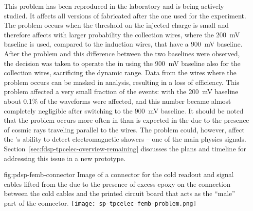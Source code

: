 This problem has been reproduced in the laboratory and is being actively 
studied. It affects all versions of  fabricated after 
the one used for the  experiment. The problem occurs 
when the threshold on the injected charge is small and therefore affects
with larger probability the collection wires, where the \SI{200}{mV} baseline 
is used, compared to the induction wires, that have a \SI{900}{mV} baseline.
After the problem and this difference between the two baselines were 
observed, the decision was taken to operate the  in  
using the \SI{900}{mV} baseline also for the collection wires, sacrificing
the dynamic range. Data from the wires where the problem occurs can
be masked in analysis, resulting in a loss of efficiency. This problem 
affected a very small fraction of the events: with the \SI{200}{mV}
baseline about \num{0.1}\% of the waveforms were affected, and this
number became almost completely negligible after switching to the 
\SI{900}{mV} baseline. It should be
noted that the problem occurs more often in  
than is expected in the    due to the presence of 
cosmic rays traveling parallel to the  wires.
The problem could, however, affect the 's ability to detect
electromagnetic showers -- one of the main physics signals.
Section~\ref{sec:fdsp-tpcelec-overview-remaining} discusses the plans and timeline 
for addressing this issue in a new  prototype.

\begin{dunefigure}
{fig:pdsp-femb-connector}
{Image of a connector for the cold readout and signal cables lifted from
the  due to the presence of excess epoxy on the 
connection between the cold cables and the printed circuit board
that acts as the ``male'' part of the connector.}
\texttt{[image: sp-tpcelec-femb-problem.png]}
\end{dunefigure}

